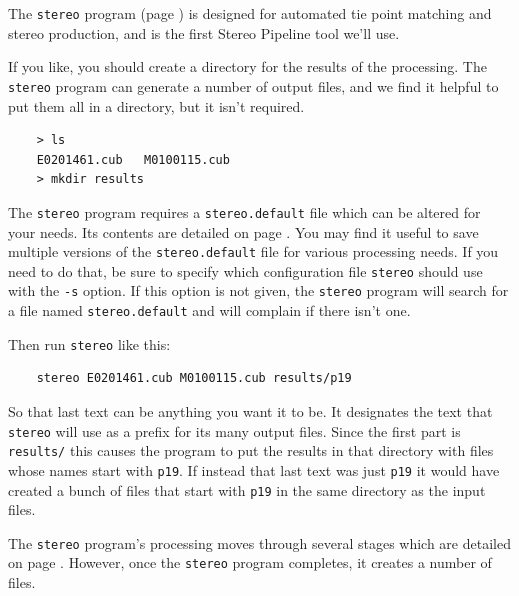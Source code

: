 The \texttt{stereo} program (page \pageref{stereo}) is designed for
automated tie point matching and stereo production, and is the first
Stereo Pipeline tool we'll use.

If you like, you should create a directory for the results of the
processing.  The \texttt{stereo} program can generate a number of
output files, and we find it helpful to put them all in a directory,
but it isn't required.

\begin{verbatim}
    > ls
    E0201461.cub   M0100115.cub
    > mkdir results
\end{verbatim}

The \texttt{stereo} program requires a \texttt{stereo.default} file
which can be altered for your needs.  Its contents are detailed on
page \pageref{stereo.default}.  You may find it useful to save
multiple versions of the \texttt{stereo.default} file for various
processing needs. If you need to do that, be sure to specify which
configuration file \texttt{stereo} should use with the \texttt{-s}
option.  If this option is not given, the \texttt{stereo} program
will search for a file named \texttt{stereo.default} and will
complain if there isn't one.

Then run \texttt{stereo} like this:

\begin{verbatim}
    stereo E0201461.cub M0100115.cub results/p19
\end{verbatim}

So that last text can be anything you want it to be.  It designates
the text that \texttt{stereo} will use as a prefix for its many
output files.  Since the first part is \texttt{results/} this causes
the program to put the results in that directory with files whose
names start with \texttt{p19}.  If instead that last
text was just \texttt{p19} it would have created a
bunch of files that start with \texttt{p19} in the
same directory as the input files.

The \texttt{stereo} program's processing moves through several
stages which are detailed on page \pageref{entrypoints}.  However,
once the \texttt{stereo} program completes, it creates a number of 
files.


